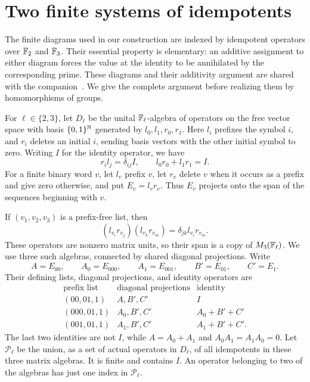 \section{Two finite systems of idempotents}
\label{sec:idempotents}

The finite diagrams used in our construction are indexed by idempotent
operators over $\mathbb F_2$ and $\mathbb F_3$.  Their essential property is elementary:
an additive assignment to either diagram forces the value at the identity
to be annihilated by the corresponding prime.  These diagrams and their
additivity argument are shared with the
companion~\cite[Section~2.1, Lemma~2.1]{OpenAIOvergroups}.
We give the complete argument before realizing them by homomorphisms of
groups.

For $\ell\in\{2,3\}$, let $D_\ell$ be the unital $\mathbb F_\ell$-algebra of
operators on the free vector space with basis $\{0,1\}^{\mathbb N}$ generated by
$l_0,l_1,r_0,r_1$.  Here $l_i$ prefixes the symbol $i$, and $r_i$ deletes
an initial $i$, sending basis vectors with the other initial symbol to
zero.  Writing $I$ for the identity operator, we have
\begin{equation}\label{eq:binary-prefix-relations}
 r_i l_j=\delta_{ij}I,
 \qquad l_0r_0+l_1r_1=I.
\end{equation}
For a finite binary word $v$, let $l_v$ prefix $v$, let $r_v$ delete $v$
when it occurs as a prefix and give zero otherwise, and put $E_v=l_vr_v$.
Thus $E_v$ projects onto the span of the sequences beginning with $v$.

If $(v_1,v_2,v_3)$ is a prefix-free list, then
\[
 (l_{v_i}r_{v_j})(l_{v_k}r_{v_m})
   =\delta_{jk}l_{v_i}r_{v_m}.
\]
These operators are nonzero matrix units, so their span is a copy of
$M_3(\mathbb F_\ell)$.  We use three such algebras, connected by shared
diagonal projections.  Write
\[
 A=E_{00},\qquad A_0=E_{000},\qquad A_1=E_{001},
 \qquad B'=E_{01},\qquad C'=E_1.
\]
Their defining lists, diagonal projections, and identity operators are
\begin{equation}\label{eq:three-prefix-lists}
\begin{array}{c|c|c}
 \text{prefix list} & \text{diagonal projections} & \text{identity}\\ \hline
 (00,01,1)  & A,B',C'   & I\\
 (000,01,1) & A_0,B',C' & A_0+B'+C'\\
 (001,01,1) & A_1,B',C' & A_1+B'+C'.
\end{array}
\end{equation}
The last two identities are not $I$, while
$A=A_0+A_1$ and $A_0A_1=A_1A_0=0$.  Let $\mathcal P_\ell$ be the union,
as a set of actual
operators in $D_\ell$, of all idempotents in these three matrix
algebras.  It is finite and contains $I$.  An operator belonging to two
of the algebras has just one index in $\mathcal P_\ell$.

